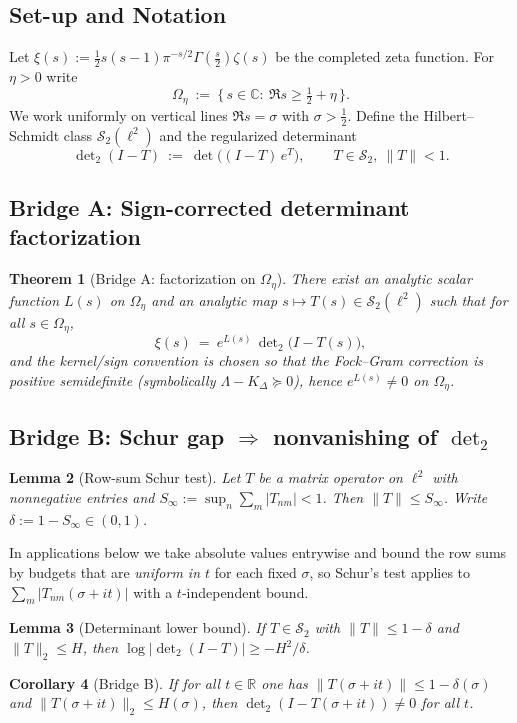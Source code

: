 \documentclass[11pt]{article}
\newtheorem{theorem}{Theorem}
\newtheorem{lemma}[theorem]{Lemma}
\newtheorem{corollary}[theorem]{Corollary}
\theoremstyle{definition}
\theoremstyle{remark}
\newcommand{\C}{\mathbb{C}}
\newcommand{\R}{\mathbb{R}}
\begin{document}
\subsection*{Set-up and Notation}
Let $\xi(s):=\tfrac12 s(s-1)\pi^{-s/2}\Gamma(\tfrac s2)\zeta(s)$ be the completed zeta function. For $\eta>0$ write
\[
\Omega_\eta\ :=\ \{\,s\in\C:\ \Re s\ge\tfrac12+\eta\,\}.
\]
We work uniformly on vertical lines $\Re s=\sigma$ with $\sigma>\tfrac12$. Define the Hilbert--Schmidt class $\mathcal S_2(\ell^2)$ and the regularized determinant
\[
\det\nolimits_2(I-T)\ :=\ \det\big((I-T)\,e^{T}\big),\qquad T\in\mathcal S_2,\ \|T\|<1.
\]

\subsection*{Bridge A: Sign-corrected determinant factorization}
\begin{theorem}[Bridge A: factorization on $\Omega_\eta$]\label{thm:bridgeA}
There exist an analytic scalar function $L(s)$ on $\Omega_\eta$ and an analytic map $s\mapsto T(s)\in \mathcal S_2(\ell^2)$ such that for all $s\in\Omega_\eta$,
\[
\xi(s)\ =\ e^{L(s)}\,\det\nolimits_{2}\!\big(I-T(s)\big),
\]
and the kernel/sign convention is chosen so that the Fock--Gram correction is positive semidefinite (symbolically $\Lambda-K_\Delta\succeq 0$), hence $e^{L(s)}\neq 0$ on $\Omega_\eta$.
\end{theorem}

\subsection*{Bridge B: Schur gap $\Rightarrow$ nonvanishing of $\det_2$}
\begin{lemma}[Row-sum Schur test]\label{lem:schur}
Let $T$ be a matrix operator on $\ell^2$ with nonnegative entries and $S_\infty:=\sup_{n}\sum_{m}|T_{nm}|<1$. Then $\|T\|\le S_\infty$. Write $\delta:=1-S_\infty\in(0,1)$.
\end{lemma}
\noindent In applications below we take absolute values entrywise and bound the row sums by budgets that are \emph{uniform in $t$} for each fixed $\sigma$, so Schur's test applies to $\sum_m |T_{nm}(\sigma+it)|$ with a $t$-independent bound.
\begin{lemma}[Determinant lower bound]\label{lem:det2-lb}
If $T\in\mathcal S_2$ with $\|T\|\le 1-\delta$ and $\|T\|_{2}\le H$, then $\log|\det\nolimits_2(I-T)|\ge -H^2/\delta$.
\end{lemma}
\begin{corollary}[Bridge B]\label{cor:bridgeB}
If for all $t\in\R$ one has $\|T(\sigma+it)\|\le 1-\delta(\sigma)$ and $\|T(\sigma+it)\|_{2}\le H(\sigma)$, then $\det\nolimits_2(I-T(\sigma+it))\ne 0$ for all $t$.
\end{corollary}
\end{document}
